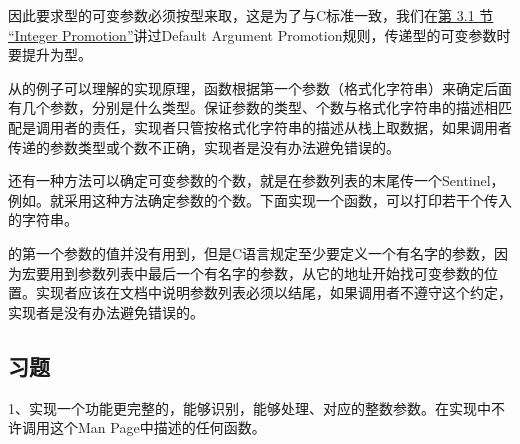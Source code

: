 

因此要求型的可变参数必须按型来取，这是为了与C标准一致，我们在\hyperlink{db.ch15s03.id2757955}{第 3.\BookSplit{}1 节 “Integer Promotion”}讲过Default Argument Promotion规则，传递型的可变参数时要提升为型。



从的例子可以理解的实现原理，函数根据第一个参数（格式化字符串）来确定后面有几个参数，分别是什么类型。保证参数的类型、个数与格式化字符串的描述相匹配是调用者的责任，实现者只管按格式化字符串的描述从栈上取数据，如果调用者传递的参数类型或个数不正确，实现者是没有办法避免错误的。



还有一种方法可以确定可变参数的个数，就是在参数列表的末尾传一个Sentinel，例如。就采用这种方法确定参数的个数。下面实现一个函数，可以打印若干个传入的字符串。





的第一个参数的值并没有用到，但是C语言规定至少要定义一个有名字的参数，因为宏要用到参数列表中最后一个有名字的参数，从它的地址开始找可变参数的位置。实现者应该在文档中说明参数列表必须以结尾，如果调用者不遵守这个约定，实现者是没有办法避免错误的。


\subsection*{习题}
%


1、实现一个功能更完整的，能够识别\BookCode{\%}，能够处理、对应的整数参数。在实现中不许调用这个Man Page中描述的任何函数。

